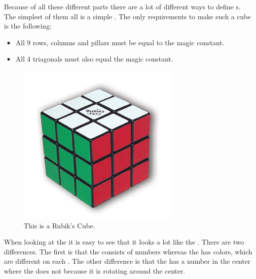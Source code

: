 Because of all these different parts there are a lot of different ways to define  \mcube{}s.
The simplest of them all is a simple  \mcube{}. The only requirements to make such a cube is the following:
\begin{itemize}
	\item All 9 rows, columns and pillars must be equal to the magic constant.
	\item All 4 triagonals must also equal the magic constant.
\end{itemize}

\begin{figure}[h]
	\centering
		\includegraphics[scale=0.4]{input/pics/rubiksCube}
	\caption{This is a Rubik's Cube.}
	\label{fig:rubiksCube}
\end{figure}

When looking at the \rubik{} it is easy to see that it looks a lot like the \mcube{}. 
There are two differences. 
The first is that the \mcube{} consists of numbers whereas the \rubik{} has colors, which are different on each \face{}.
The other difference is that the \mcube{} has a number in the center where the \rubik{} does not because it is rotating around the center. 
